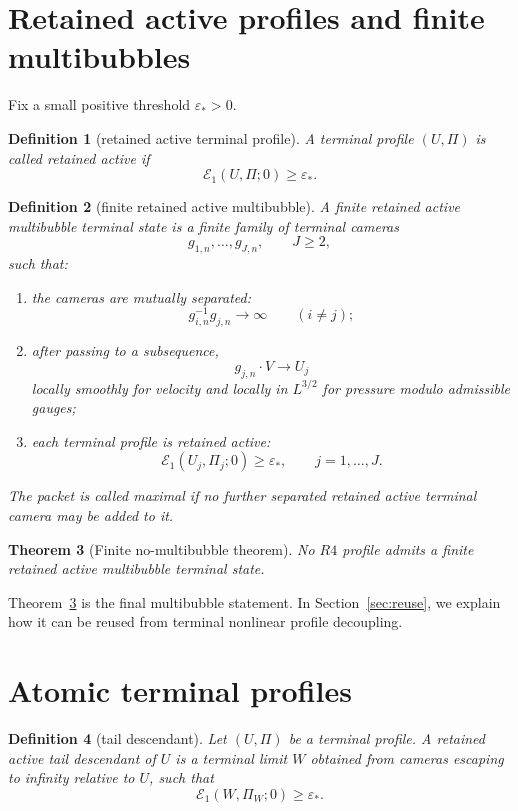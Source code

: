 \documentclass[11pt]{article}
\numberwithin{equation}{section}
\newtheorem{theorem}{Theorem}[section]
\newtheorem{definition}[theorem]{Definition}
\newcommand{\eps}{\varepsilon}
\newcommand{\cE}{\mathcal E}
\begin{document}
\section{Retained active profiles and finite multibubbles}

Fix a small positive threshold \(\eps_*>0\).

\begin{definition}[retained active terminal profile]
A terminal profile \((U,\Pi)\) is called retained active if
\begin{equation}
  \cE_1(U,\Pi;0)\ge \eps_*.
  \label{eq:active-profile}
\end{equation}
\end{definition}

\begin{definition}[finite retained active multibubble]
A finite retained active multibubble terminal state is a finite family of
terminal cameras
\[
  g_{1,n},\dots,g_{J,n},
  \qquad J\ge2,
\]
such that:
\begin{enumerate}[label=(\roman*)]
  \item the cameras are mutually separated:
  \[
    g_{i,n}^{-1}g_{j,n}\to\infty
    \qquad (i\ne j);
  \]
  \item after passing to a subsequence,
  \[
    g_{j,n}\cdot V\to U_j
  \]
  locally smoothly for velocity and locally in \(L^{3/2}\) for pressure modulo
  admissible gauges;
  \item each terminal profile is retained active:
  \[
    \cE_1(U_j,\Pi_j;0)\ge\eps_*,
    \qquad j=1,\dots,J.
  \]
\end{enumerate}
The packet is called maximal if no further separated retained active terminal
camera may be added to it.
\end{definition}

\begin{theorem}[Finite no-multibubble theorem]
\label{thm:no-multi}
No \(R4\) profile admits a finite retained active multibubble terminal state.
\end{theorem}

Theorem~\ref{thm:no-multi} is the final multibubble statement.  In
Section~\ref{sec:reuse}, we explain how it can be reused from terminal
nonlinear profile decoupling.

\section{Atomic terminal profiles}

\begin{definition}[tail descendant]
Let \((U,\Pi)\) be a terminal profile.  A retained active tail descendant of
\(U\) is a terminal limit \(W\) obtained from cameras escaping to infinity
relative to \(U\), such that
\[
  \cE_1(W,\Pi_W;0)\ge\eps_*.
\]
\end{definition}
\end{document}
